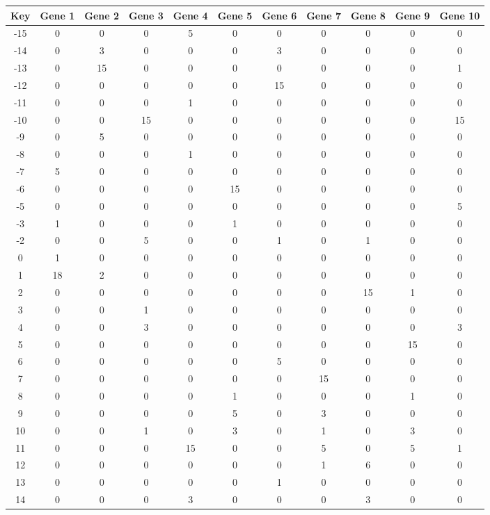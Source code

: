 \begin{tabular}{|c|c|c|c|c|c|c|c|c|c|c|}
\hline
Key & Gene 1 & Gene 2 & Gene 3 & Gene 4 & Gene 5 & Gene 6 & Gene 7 & Gene 8 & Gene 9 & Gene 10 \\
\hline
-15 & 0 & 0 & 0 & 5 & 0 & 0 & 0 & 0 & 0 & 0 \\
-14 & 0 & 3 & 0 & 0 & 0 & 3 & 0 & 0 & 0 & 0 \\
-13 & 0 & 15 & 0 & 0 & 0 & 0 & 0 & 0 & 0 & 1 \\
-12 & 0 & 0 & 0 & 0 & 0 & 15 & 0 & 0 & 0 & 0 \\
-11 & 0 & 0 & 0 & 1 & 0 & 0 & 0 & 0 & 0 & 0 \\
-10 & 0 & 0 & 15 & 0 & 0 & 0 & 0 & 0 & 0 & 15 \\
-9 & 0 & 5 & 0 & 0 & 0 & 0 & 0 & 0 & 0 & 0 \\
-8 & 0 & 0 & 0 & 1 & 0 & 0 & 0 & 0 & 0 & 0 \\
-7 & 5 & 0 & 0 & 0 & 0 & 0 & 0 & 0 & 0 & 0 \\
-6 & 0 & 0 & 0 & 0 & 15 & 0 & 0 & 0 & 0 & 0 \\
-5 & 0 & 0 & 0 & 0 & 0 & 0 & 0 & 0 & 0 & 5 \\
-3 & 1 & 0 & 0 & 0 & 1 & 0 & 0 & 0 & 0 & 0 \\
-2 & 0 & 0 & 5 & 0 & 0 & 1 & 0 & 1 & 0 & 0 \\
0 & 1 & 0 & 0 & 0 & 0 & 0 & 0 & 0 & 0 & 0 \\
1 & 18 & 2 & 0 & 0 & 0 & 0 & 0 & 0 & 0 & 0 \\
2 & 0 & 0 & 0 & 0 & 0 & 0 & 0 & 15 & 1 & 0 \\
3 & 0 & 0 & 1 & 0 & 0 & 0 & 0 & 0 & 0 & 0 \\
4 & 0 & 0 & 3 & 0 & 0 & 0 & 0 & 0 & 0 & 3 \\
5 & 0 & 0 & 0 & 0 & 0 & 0 & 0 & 0 & 15 & 0 \\
6 & 0 & 0 & 0 & 0 & 0 & 5 & 0 & 0 & 0 & 0 \\
7 & 0 & 0 & 0 & 0 & 0 & 0 & 15 & 0 & 0 & 0 \\
8 & 0 & 0 & 0 & 0 & 1 & 0 & 0 & 0 & 1 & 0 \\
9 & 0 & 0 & 0 & 0 & 5 & 0 & 3 & 0 & 0 & 0 \\
10 & 0 & 0 & 1 & 0 & 3 & 0 & 1 & 0 & 3 & 0 \\
11 & 0 & 0 & 0 & 15 & 0 & 0 & 5 & 0 & 5 & 1 \\
12 & 0 & 0 & 0 & 0 & 0 & 0 & 1 & 6 & 0 & 0 \\
13 & 0 & 0 & 0 & 0 & 0 & 1 & 0 & 0 & 0 & 0 \\
14 & 0 & 0 & 0 & 3 & 0 & 0 & 0 & 3 & 0 & 0 \\
\hline
\end{tabular}